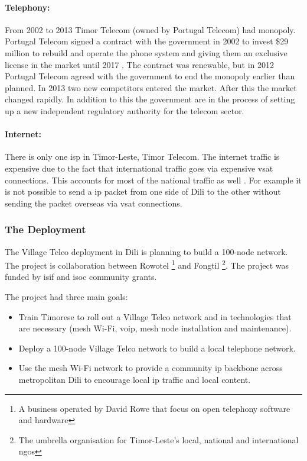 \paragraph{Telephony: }
From 2002 to 2013 Timor Telecom (owned by Portugal Telecom) had monopoly. Portugal Telecom signed a contract with the government in 2002 to invest \$29 million to rebuild and operate the phone system and giving them an exclusive license in the market until 2017 \cite{wiki_telecom_east_timor}. The contract was renewable, but in 2012 Portugal Telecom agreed with the government to end the monopoly earlier than planned\cite{budde}. In 2013 two new competitors entered the market. After this the market changed rapidly. In addition to this the government are in the process of setting up a new independent regulatory authority for the telecom sector. 

\paragraph{Internet:} There is only one \gls{isp} in Timor-Leste, Timor Telecom\cite{wiki_telecom_east_timor}. The internet traffic is expensive due to the fact that international traffic goes via expensive \gls{vsat} connections. This accounts for most of the national traffic as well \cite{vt_dili}. For example it is not possible to send a \gls{ip} packet from one side of Dili to the other without sending the packet overseas via \gls{vsat} connections. 



\subsubsection{The Deployment}
The Village Telco deployment in Dili is planning to build a 100-node network. The project is collaboration between Rowotel \footnote{A business operated by David Rowe that focus on open telephony software and hardware} and Fongtil \footnote{The umbrella organisation for Timor-Leste’s local, national and international \glspl{ngo} }. The project was funded by \gls{isif} and \gls{isoc} community grants. 

The project had three main goals\cite{vt_dili}:
\begin{itemize}
\item Train Timorese to roll out a Village Telco network and in technologies that are necessary (mesh Wi-Fi, \gls{voip}, mesh node installation and maintenance).
\item Deploy a 100-node Village Telco network to build a local telephone network.
\item Use the mesh Wi-Fi network to provide a community \gls{ip} backbone across metropolitan Dili to encourage local \gls{ip} traffic and local content.
\end{itemize}

